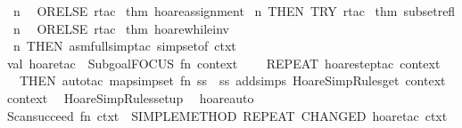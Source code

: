 \begin{isabellebody}
\endisaantiq
\ n\isanewline
\ \ ORELSE\ {}rtac\ %
\isaantiq
thm\ hoare{}assignment{}%
\endisaantiq
\ n\ THEN\ TRY\ {}rtac\ %
\isaantiq
thm\ subset{}refl{}%
\endisaantiq
\ n{}{}\isanewline
\ \ ORELSE\ {}rtac\ %
\isaantiq
thm\ hoare{}while{}inv{}%
\endisaantiq
\ n\ THEN\ asm{}full{}simp{}tac\ {}simpset{}of\ ctxt{}\ {}{}\isanewline
\isanewline
val\ hoare{}tac\ {}\ Subgoal{}FOCUS\ {}fn\ {}context{}\ {}{}{}{}\ {}{}\isanewline
\ \ REPEAT\ {}hoare{}step{}tac\ context\ {}{}\isanewline
\ \ THEN\ auto{}tac\ {}map{}simpset\ {}fn\ ss\ {}{}\ ss\ addsimps\ HoareSimpRules{}get\ context{}\ context{}{}\isanewline
\isanewline
{}\isanewline
\isanewline
{}\isamarkupfalse%
\ {}\ HoareSimpRules{}setup\ {}\isanewline
\isanewline
{}\isamarkupfalse%
\ hoare{}auto\ {}\ {}\isanewline
Scan{}succeed\ {}fn\ ctxt\ {}{}\ SIMPLE{}METHOD\ {}REPEAT\ {}CHANGED\ {}hoare{}tac\ ctxt\ {}{}{}{}{}\isanewline

\end{isabellebody}
